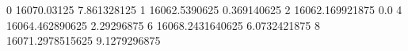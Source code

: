 0 16070.03125 7.861328125
1 16062.5390625 0.369140625
2 16062.169921875 0.0
4 16064.462890625 2.29296875
6 16068.2431640625 6.0732421875
8 16071.2978515625 9.1279296875
